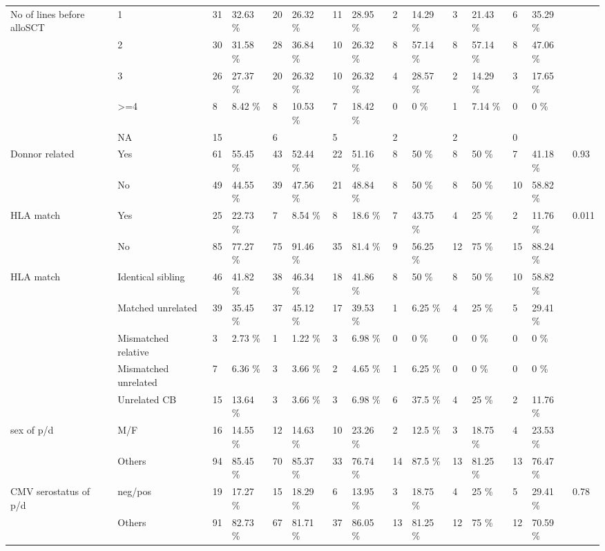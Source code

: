 \documentclass[a4paper,11pt] {article}
\begin{document}
\begin{landscape}
\begin{longtable}{lllllllllllllll}
  No of lines before alloSCT & 1 & 31 & 32.63 \% & 20 & 26.32 \% & 11 & 28.95 \% & 2 & 14.29 \% & 3 & 21.43 \% & 6 & 35.29 \% &  \\ 
   & 2 & 30 & 31.58 \% & 28 & 36.84 \% & 10 & 26.32 \% & 8 & 57.14 \% & 8 & 57.14 \% & 8 & 47.06 \% &  \\ 
   & 3 & 26 & 27.37 \% & 20 & 26.32 \% & 10 & 26.32 \% & 4 & 28.57 \% & 2 & 14.29 \% & 3 & 17.65 \% &  \\ 
   & >=4 & 8 & 8.42 \% & 8 & 10.53 \% & 7 & 18.42 \% & 0 & 0 \% & 1 & 7.14 \% & 0 & 0 \% &  \\ 
   & NA & 15 &  & 6 &  & 5 &  & 2 &  & 2 &  & 0 &  &  \\ 
  Donnor related & Yes & 61 & 55.45 \% & 43 & 52.44 \% & 22 & 51.16 \% & 8 & 50 \% & 8 & 50 \% & 7 & 41.18 \% & 0.93 \\ 
   & No & 49 & 44.55 \% & 39 & 47.56 \% & 21 & 48.84 \% & 8 & 50 \% & 8 & 50 \% & 10 & 58.82 \% &  \\ 
  HLA match & Yes & 25 & 22.73 \% & 7 & 8.54 \% & 8 & 18.6 \% & 7 & 43.75 \% & 4 & 25 \% & 2 & 11.76 \% & 0.011 \\ 
   & No & 85 & 77.27 \% & 75 & 91.46 \% & 35 & 81.4 \% & 9 & 56.25 \% & 12 & 75 \% & 15 & 88.24 \% &  \\ 
  HLA match & Identical sibling & 46 & 41.82 \% & 38 & 46.34 \% & 18 & 41.86 \% & 8 & 50 \% & 8 & 50 \% & 10 & 58.82 \% &  \\ 
   & Matched unrelated & 39 & 35.45 \% & 37 & 45.12 \% & 17 & 39.53 \% & 1 & 6.25 \% & 4 & 25 \% & 5 & 29.41 \% &  \\ 
   & Mismatched relative & 3 & 2.73 \% & 1 & 1.22 \% & 3 & 6.98 \% & 0 & 0 \% & 0 & 0 \% & 0 & 0 \% &  \\ 
   & Mismatched unrelated & 7 & 6.36 \% & 3 & 3.66 \% & 2 & 4.65 \% & 1 & 6.25 \% & 0 & 0 \% & 0 & 0 \% &  \\ 
   & Unrelated CB & 15 & 13.64 \% & 3 & 3.66 \% & 3 & 6.98 \% & 6 & 37.5 \% & 4 & 25 \% & 2 & 11.76 \% &  \\ 
  sex of p/d & M/F & 16 & 14.55 \% & 12 & 14.63 \% & 10 & 23.26 \% & 2 & 12.5 \% & 3 & 18.75 \% & 4 & 23.53 \% &  \\ 
   & Others & 94 & 85.45 \% & 70 & 85.37 \% & 33 & 76.74 \% & 14 & 87.5 \% & 13 & 81.25 \% & 13 & 76.47 \% &  \\ 
  CMV serostatus of p/d & neg/pos & 19 & 17.27 \% & 15 & 18.29 \% & 6 & 13.95 \% & 3 & 18.75 \% & 4 & 25 \% & 5 & 29.41 \% & 0.78 \\ 
   & Others & 91 & 82.73 \% & 67 & 81.71 \% & 37 & 86.05 \% & 13 & 81.25 \% & 12 & 75 \% & 12 & 70.59 \% &  \\ 

\end{longtable}
\end{landscape}
\end{document}
